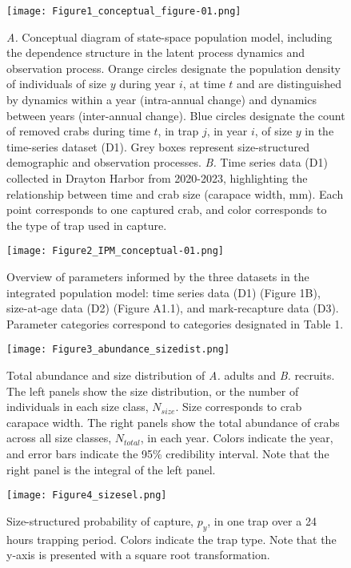 \documentclass{article}
\begin{document}
\begin{figure}[H]
    \centering
    \texttt{[image: Figure1\_conceptual\_figure-01.png]}
    \caption{\textit{A.} Conceptual diagram of state-space population model, including the dependence structure in the latent process dynamics and observation process. Orange circles designate the population density of individuals of size $y$ during year $i$, at time $t$ and are distinguished by dynamics within a year (intra-annual change) and dynamics between years (inter-annual change). Blue circles designate the count of removed crabs during time $t$, in trap $j$, in year $i$, of size $y$ in the time-series dataset (D1). Grey boxes represent size-structured demographic and observation processes. \textit{B.} Time series data (D1) collected in Drayton Harbor from 2020-2023, highlighting the relationship between time and crab size (carapace width, mm). Each point corresponds to one captured crab, and color corresponds to the type of trap used in capture.}
\end{figure}

\begin{figure}[H]
    \centering
    \texttt{[image: Figure2\_IPM\_conceptual-01.png]}
    \caption{Overview of parameters informed by the three datasets in the integrated population model: time series data (D1) (Figure 1B), size-at-age data (D2) (Figure A1.1), and mark-recapture data (D3). Parameter categories correspond to categories designated in Table 1.}
\end{figure}

\begin{figure}[H]
    \centering
    \texttt{[image: Figure3\_abundance\_sizedist.png]}
    \caption{Total abundance and size distribution of \textit{A.} adults and \textit{B.} recruits. The left panels show the size distribution, or the number of individuals in each size class, $N_{size}$. Size corresponds to crab carapace width. The right panels show the total abundance of crabs across all size classes, $N_{total}$, in each year. Colors indicate the year, and error bars indicate the 95\% credibility interval. Note that the right panel is the integral of the left panel.}
\end{figure}

\begin{figure}[H]
    \centering
    \texttt{[image: Figure4\_sizesel.png]}
    \caption{Size-structured probability of capture, $p_{y}$, in one trap over a 24 hours trapping period. Colors indicate the trap type. Note that the y-axis is presented with a square root transformation.}
\end{figure}
\end{document}
